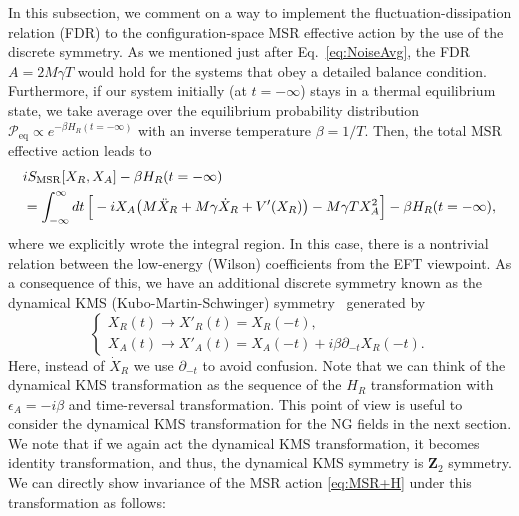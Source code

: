 \documentclass[a4paper,11pt]{article}
\begin{document}
In this subsection, we comment on 
a way to implement the fluctuation-dissipation relation (FDR) 
to the configuration-space MSR effective action 
by the use of the discrete symmetry.
As we mentioned just after Eq.~\eqref{eq:NoiseAvg}, the FDR $A= 2M \gamma T$ would hold for the systems 
that obey a detailed balance condition.
Furthermore, if our system initially (at $ t = - \infty$) 
stays in a thermal equilibrium state, 
we take average over the equilibrium probability distribution 
$\mathcal P_{\mathrm{eq}} \propto e^{- \beta H_R (t = - \infty)}$ with an inverse 
temperature $\beta = 1/T$. 
Then, the total MSR effective action leads to
\begin{align}
\nonumber
 &iS_{\rm MSR} [X_{R},X_{A}]  - \beta H_R (t=-\infty)
 \\
& = \int_{-\infty}^{\infty} dt\, 
 \Big[  -i X_A \big( M\ddot{X}_R + M \gamma\dot{X}_{R} + V'(X_{R})
 \big) - M \gamma T X_A^2 \Big] 
 - \beta H_R (t=-\infty), \label{eq:MSR+H}
\end{align}
where we explicitly wrote the integral region. 
In this case, there is a nontrivial relation between the low-energy 
(Wilson) coefficients from the EFT viewpoint. 
As a consequence of this,
we have an additional discrete symmetry 
known as the dynamical KMS (Kubo-Martin-Schwinger) symmetry~\cite{Aron,Glorioso:2017fpd,Aron2,Sieberer:2015hba}
generated by
\begin{equation}
 \begin{cases}
  X_R (t) \to X'_R (t) = X_R(-t) , \\
  X_A (t) \to X'_A (t) = X_A (-t) + i \beta \partial_{-t} X_R (-t).
 \end{cases}\label{dyn:KMS:x}
\end{equation}
Here, instead of $\dot{X}_R$ we use $\partial_{-t}$ to avoid confusion.
Note that we can think of the dynamical KMS transformation as the sequence of the $H_R$ transformation with $\epsilon_{A}=-i\beta$ and time-reversal 
transformation. 
This point of view is useful to consider the dynamical KMS 
transformation for the NG fields in the next section.
We note that if we again act the dynamical KMS transformation, 
it becomes identity transformation, and thus, 
the dynamical KMS symmetry is $\bm{Z}_2$ symmetry.
We can directly show invariance of the MSR action \eqref{eq:MSR+H} 
under this transformation as follows:
\end{document}
